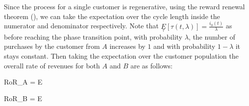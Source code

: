 Since the process for a single customer is regenerative, using the reward renewal theorem (\cite{10.2307/1426216}), we can take the expectation over the cycle length inside the numerator and denominator respectively.
Note that $\underset{\tau}E[\tau(t,\lambda)] = \frac{i_0(t)}{\lambda}$ as before reaching the phase transition point, with probability $\lambda$, the number of purchases by the customer from $A$ increases by $1$ and with probability $1-\lambda$ it stays constant.
Then taking the expectation over the customer population the overall rate of revenues for both $A$ and $B$ are as follows:

\beq
RoR_A = E
\eeq

\beq
RoR_B = E
\eeq
